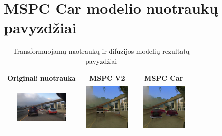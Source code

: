 \documentclass{VUMIFPSbakalaurinis}
\begin{document}
\section{MSPC Car modelio nuotraukų pavyzdžiai}
    \begin{table}[H]
        \footnotesize
        \centering
        \caption{Transformuojamų nuotraukų ir difuzijos modelių rezultatų pavyzdžiai}
        {\begin{tabular}{|c|c|c|c|} \hline
            Originali nuotrauka & MSPC V2 & MSPC Car \\
            \hline
            \includegraphics[width=100,height=85]{img/original/7c23993b-00000000} & 
            \includegraphics[width=100,height=85]{img/mspcv2/7c23993b-00000000} & 
            \includegraphics[width=100,height=85]{img/mspccar/7c23993b-00000000} \\

\end{tabular}}
\end{table}
\end{document}
